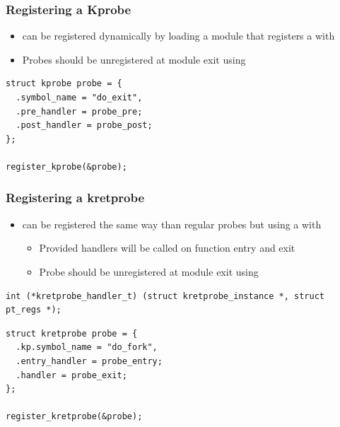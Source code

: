 \begin{frame}[fragile]
  \frametitle{Registering a Kprobe}
  \begin{itemize}
    \item {} can be registered dynamically by loading a module that
          registers a  with 
    \item Probes should be unregistered at module exit using
  \end{itemize}

  \begin{block}{}
    \begin{verbatim}
struct kprobe probe = {
  .symbol_name = "do_exit",
  .pre_handler = probe_pre;
  .post_handler = probe_post;
};

register_kprobe(&probe);
    \end{verbatim}
  \end{block}
\end{frame}

\begin{frame}[fragile]
  \frametitle{Registering a kretprobe}
  \begin{itemize}
    \item {} can be registered the same way than regular probes but using
          a  with 
    \begin{itemize}
      \item Provided handlers will be called on function entry and exit
      \item Probe should be unregistered at module exit using
    \end{itemize}
  \end{itemize}

  \begin{block}{}
    \begin{verbatim}
int (*kretprobe_handler_t) (struct kretprobe_instance *, struct pt_regs *);
    \end{verbatim}
  \end{block}

  \begin{block}{}
    \begin{verbatim}
struct kretprobe probe = {
  .kp.symbol_name = "do_fork",
  .entry_handler = probe_entry;
  .handler = probe_exit;
};

register_kretprobe(&probe);
    \end{verbatim}
  \end{block}
\end{frame}

